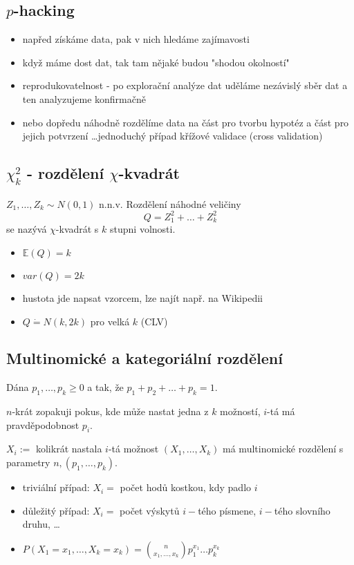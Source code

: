 \documentclass[../main.tex]{subfiles}
\begin{document}
\subsection{$p$-hacking}
\begin{itemize}
    \item napřed získáme data, pak v nich hledáme zajímavosti
    \item když máme dost dat, tak tam nějaké budou "shodou okolností"
    \item reprodukovatelnost - po explorační analýze dat uděláme nezávislý sběr dat a ten analyzujeme konfirmačně
    \item nebo dopředu náhodně rozdělíme data na část pro tvorbu hypotéz a část pro jejich potvrzení \dots jednoduchý případ křížové validace (cross validation)
\end{itemize}

\subsection{$\chi^2_k$ - rozdělení $\chi$-kvadrát}
\begin{definition}
    $Z_1,\dots,Z_k \sim N(0,1)$ n.n.v. Rozdělení náhodné veličiny
    \[Q = Z^2_1 + \dots + Z^2_k\]
    se nazývá $\chi$-kvadrát s $k$ stupni volnosti.
    \begin{itemize}
        \item $\mathbb{E}(Q) = k$
        \item $var(Q) = 2k$
        \item hustota jde napsat vzorcem, lze najít např. na Wikipedii
        \item $Q \dot{=} N(k,2k)$ pro velká $k$ (CLV)
    \end{itemize}
\end{definition}

\subsection{Multinomické a kategoriální rozdělení}
\begin{definition}
    Dána $p_1,\dots,p_k \geq 0$ a tak, že $p_1 + p_2 + \dots + p_k = 1$.
    
    $n$-krát zopakuji pokus, kde může nastat jedna z $k$ možností, $i$-tá má pravděpodobnost $p_i$.

    $X_i :=$ kolikrát nastala $i$-tá možnost $(X_1,\dots,X_k)$ má multinomické rozdělení s parametry $n,(p_1,\dots,p_k).$
    \begin{itemize}
        \item triviální případ: $X_i = $ počet hodů kostkou, kdy padlo $i$
        \item důležitý případ: $X_i = $ počet výskytů $i-$tého písmene, $i-$tého slovního druhu, \dots
        \item $P(X_1 = x_1, \dots , X_k = x_k) = {{n}\choose{x_1,\dots ,x_k}}p_{1}^{x_1}\dots p_{k}^{x_k}$
    \end{itemize}
\end{definition}
\end{document}
